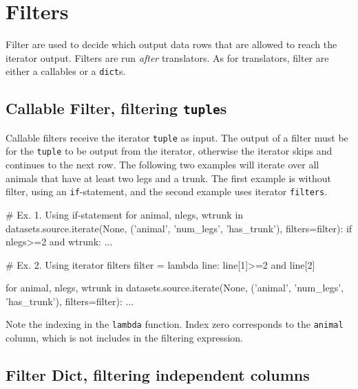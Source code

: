 \section{Filters}
\label{sec:filters}

Filter are used to decide which output data rows that are allowed to
reach the iterator output.  Filters are run \emph{after} translators.
As for translators, filter are either a callables or a \texttt{dict}s.




\subsection*{Callable Filter, filtering \texttt{tuple}s}

Callable filters receive the iterator \texttt{tuple} as input.  The
output of a filter must be \pyTrue for the \texttt{tuple} to be output
from the iterator, otherwise the iterator skips and continues to the
next row.  The following two examples will iterate over all animals
that have at least two legs and a trunk.  The first example is without
filter, using an \texttt{if}-statement, and the second example uses
iterator \texttt{filters}.
\begin{python}
# Ex. 1. Using if-statement
for animal, nlegs, wtrunk in datasets.source.iterate(None,
        ('animal', 'num_legs', 'has_trunk'), filters=filter):
        if nlegs>=2 and wtrunk:
    ...

# Ex. 2.  Using iterator filters
filter = lambda line: line[1]>=2 and line[2]

for animal, nlegs, wtrunk in datasets.source.iterate(None,
        ('animal', 'num_legs', 'has_trunk'), filters=filter):
    ...
\end{python}
Note the indexing in the \texttt{lambda} function.  Index zero
corresponds to the \texttt{animal} column, which is not includes in
the filtering expression.



\subsection*{Filter Dict, filtering independent columns}

